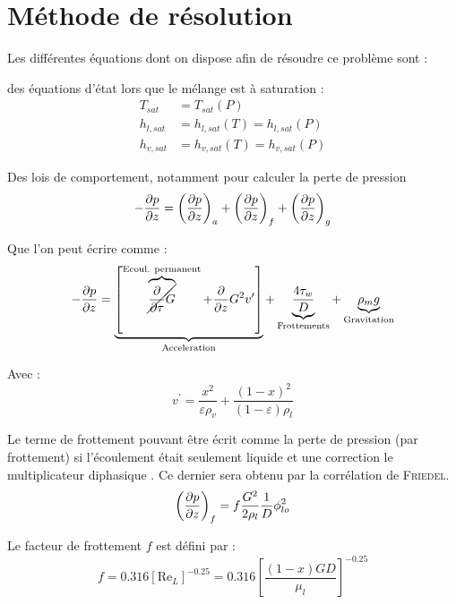 \section{Méthode de résolution}

Les différentes équations dont on dispose afin de résoudre ce problème sont :

des équations d'état lors que le mélange est à saturation :
\begin{align}
    T_{sat} &= T_{sat}(P) \\
    h_{l,sat} &= h_{l,sat}(T) = h_{l,sat}(P) \\
    h_{v,sat} &= h_{v,sat}(T) = h_{v,sat}(P)
\end{align}

Des lois de comportement, notamment pour calculer la perte de pression
\begin{equation}
     -\pder[p]{z} = \left(\pder[p]{z} \right)_{a} + \left(\pder[p]{z} \right)_{f} + \left(\pder[p]{z} \right)_{g}
\end{equation}

Que l'on peut écrire comme :
\begin{equation}
    -\pder[p]{z} = \underbrace{\left[\overbrace{\cancel{\frac{\partial}{\partial \tau} G}}^{\text{Ecoul. permanent}}+\frac{\partial}{\partial z} G^{2} v^{\prime}\right]}_{\text{Acceleration}}+\underbrace{\frac{4 \tau_{w}}{D}}_{\text{Frottements}}+\underbrace{\rho_{m} g}_{\text{Gravitation}}
\end{equation}

Avec :
\begin{equation}
    v^{\prime}=\frac{x^{2}}{\varepsilon \rho_{v}}+\frac{(1-x)^{2}}{(1-\varepsilon) \rho_{l}}
\end{equation}

Le terme de frottement pouvant être écrit comme la perte de pression (par frottement) si l'écoulement était seulement liquide et une correction le \og multiplicateur diphasique \fg{}. Ce dernier sera obtenu par la corrélation de \textsc{Friedel}.
\begin{equation}
    \left(\pder[p]{z} \right)_{f} = f\frac{G^2}{2 \rho_l}\frac{1}{D} \phi_{lo}^2
\end{equation}

Le facteur de frottement $f$ est défini par :
\begin{equation}
    f = 0.316 \left[\text{Re}_L\right]^{-0.25} = 0.316 \left[\frac{(1-x)G D}{\mu_l}\right]^{-0.25} 
\end{equation}

